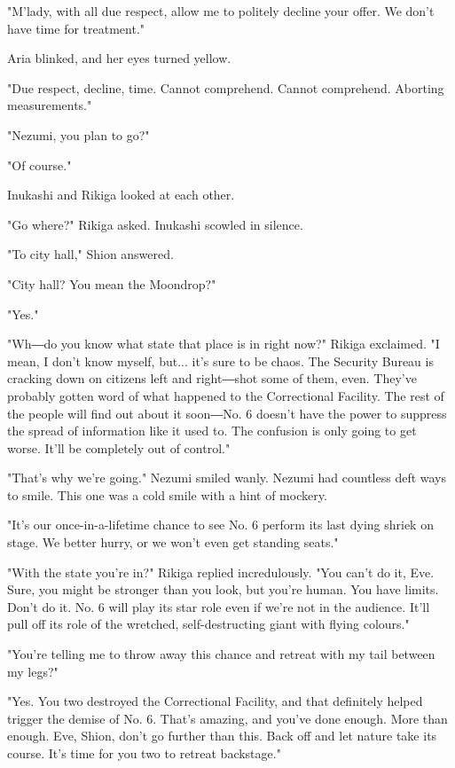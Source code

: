 "M'lady, with all due respect, allow me to politely decline your offer.
We don't have time for treatment."

Aria blinked, and her eyes turned yellow.

"Due respect, decline, time. Cannot comprehend. Cannot comprehend.
Aborting measurements."

"Nezumi, you plan to go?"

"Of course."

Inukashi and Rikiga looked at each other.

"Go where?" Rikiga asked. Inukashi scowled in silence.

"To city hall," Shion answered.

"City hall? You mean the Moondrop?"

"Yes."

"Wh―do you know what state that place is in right now?" Rikiga
exclaimed. "I mean, I don't know myself, but... it's sure to be chaos.
The Security Bureau is cracking down on citizens left and right―shot
some of them, even. They've probably gotten word of what happened to the
Correctional Facility. The rest of the people will find out about it
soon―No. 6 doesn't have the power to suppress the spread of information
like it used to. The confusion is only going to get worse. It'll be
completely out of control."

"That's why we're going." Nezumi smiled wanly. Nezumi had countless deft
ways to smile. This one was a cold smile with a hint of mockery.

"It's our once-in-a-lifetime chance to see No. 6 perform its last dying
shriek on stage. We better hurry, or we won't even get standing seats."

"With the state you're in?" Rikiga replied incredulously. "You can't do
it, Eve. Sure, you might be stronger than you look, but you're human.
You have limits. Don't do it. No. 6 will play its star role even if
we're not in the audience. It'll pull off its role of the wretched,
self-destructing giant with flying colours."

"You're telling me to throw away this chance and retreat with my tail
between my legs?"

"Yes. You two destroyed the Correctional Facility, and that definitely
helped trigger the demise of No. 6. That's amazing, and you've done
enough. More than enough. Eve, Shion, don't go further than this. Back
off and let nature take its course. It's time for you two to retreat
backstage."

